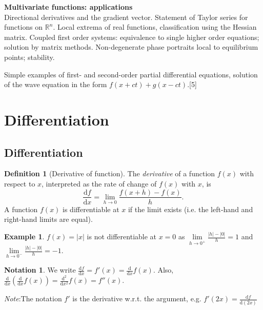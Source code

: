 \documentclass[a4paper]{article}
\theoremstyle{definition}
\newtheorem*{defi}{Definition}
\newtheorem*{eg}{Example}
\newtheorem*{notation}{Notation}
\newcommand{\note}{\noindent \emph{Note}:\;}
\newcommand{\R}{\mathbb{R}}
\renewcommand{\d}{\mathrm{d}}
\let\stdsection\section
\renewcommand\section{\newpage\stdsection}
\begin{document}
{\vspace{10pt}
\noindent\textbf{Multivariate functions: applications}\\
Directional derivatives and the gradient vector. Statement of Taylor series for functions on $\R^n$. Local extrema of real functions, classification using the Hessian matrix. Coupled first order systems: equivalence to single higher order equations; solution by matrix methods. Non-degenerate phase portraits local to equilibrium points; stability.

\vspace{5pt}
\noindent Simple examples of first- and second-order partial differential equations, solution of the wave equation in the form $f(x + ct) + g(x - ct)$.\hspace*{\fill}[5]}
\tableofcontents
\pagebreak
\section{Differentiation}
\subsection{Differentiation}
\begin{defi}[Derivative of function]
  The \emph{derivative} of a function $f(x)$ with respect to $x$, interpreted as the rate of change of $f(x)$ with $x$, is
  \[
  \frac{\d f}{\d x} = \lim_{h\to 0} \frac{f(x + h) - f(x)}{h}.
  \]
  A function $f(x)$ is differentiable at $x$ if the limit exists (i.e. the left-hand and right-hand limits are equal).
\end{defi}

\begin{eg}
  $f(x)=|x|$ is not differentiable at $x = 0$ as $\lim\limits_{h\to 0^+} \frac{|h| - |0|}{h}= 1$ and $\lim\limits_{h\to 0^-} \frac{|h| - |0|}{h}= -1$.
\end{eg}

\begin{notation}
  We write $\frac{\d f}{\d x} = f'(x) = \frac{\d}{\d x} f(x)$. Also, $\frac{\d}{\d x}\left(\frac{\d}{\d x} f(x)\right) = \frac{\d^2}{\d x^2} f(x) = f''(x)$.

\note The notation $f'$ is the derivative w.r.t. the argument, e.g. $f'(2x) = \frac{\d f}{\d (2x)}$
\end{notation}
\end{document}
